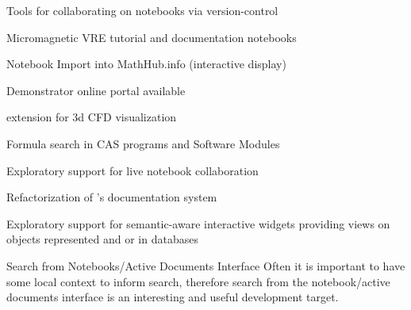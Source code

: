 \begin{workpackage}
\begin{wpdelivs}
  \begin{wpdeliv}[due=12,id=jupyter-collab,dissem=PU,nature=OTHER,lead=SR]
      {Tools for collaborating on notebooks via version-control}
  \end{wpdeliv}
    \begin{wpdeliv}[due=21,id=oommf-nb-documentation,dissem=PU,nature=DEC,lead=USO]
      {Micromagnetic VRE tutorial and documentation notebooks}
    \end{wpdeliv}
    \begin{wpdeliv}[id=jupyter-import,due=24,nature=DEM,dissem=PU,lead=JU]
      {Notebook Import into MathHub.info (interactive display)}
    \end{wpdeliv}
    \begin{wpdeliv}[due=24,id=oommf-nb-tmp,dissem=PU,nature=DEC,lead=USO]
      {Demonstrator online portal available}
    \end{wpdeliv}
  \begin{wpdeliv}[due=24,id=cfd-vis,dissem=PU,nature=OTHER,lead=SR]
      {\Jupyter extension for 3d CFD visualization}
  \end{wpdeliv}
   \begin{wpdeliv}[id=cassearch,due=30,nature=OTHER,dissem=PU,lead=JU]
      {Formula search in CAS programs and Software Modules}
    \end{wpdeliv}
  \begin{wpdeliv}[due=36,id=jupyter-live-collab,dissem=PU,nature=OTHER,lead=SR]
      {Exploratory support for live notebook collaboration}
  \end{wpdeliv}
  \begin{wpdeliv}[due=24,id=sage-sphinx,dissem=PU,nature=OTHER,lead=PS]
      {Refactorization of \Sage's \Sphinx documentation system}
  \end{wpdeliv}
  \begin{wpdeliv}[due=36,id=ipython-advanced-interacts,dissem=PU,nature=DEM,lead=PS]
      {Exploratory support for semantic-aware interactive widgets providing views on objects
      represented and or in databases}
  \end{wpdeliv}
\begin{wpdeliv}[id=nbad-search,due=42,nature=OTHER,dissem=PU,lead=JU]
  {Search from Notebooks/Active Documents Interface} Often it is important to have some
  local context to inform search, therefore search from the notebook/active documents
  interface is an interesting and useful development target.
\end{wpdeliv}



\end{wpdelivs}
\end{workpackage}
